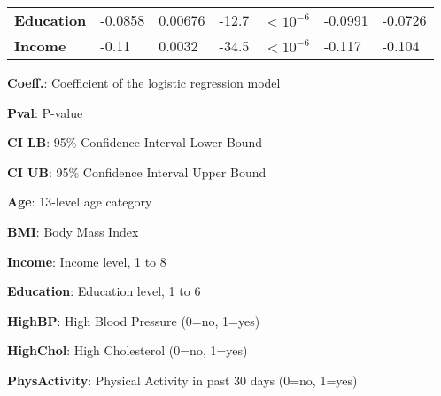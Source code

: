 \documentclass[11pt]{article}
\begin{document}
\begin{table}[h]
\begin{threeparttable}
{\begin{tabular}{lllllll}
\textbf{Education} & \raisebox{2ex}{\hypertarget{B7a}{}}-0.0858 & \raisebox{2ex}{\hypertarget{B7b}{}}0.00676 & \raisebox{2ex}{\hypertarget{B7c}{}}-12.7 & $<$\raisebox{2ex}{\hypertarget{B7d}{}}$10^{-6}$ & \raisebox{2ex}{\hypertarget{B7e}{}}-0.0991 & \raisebox{2ex}{\hypertarget{B7f}{}}-0.0726 \\
\textbf{Income} & \raisebox{2ex}{\hypertarget{B8a}{}}-0.11 & \raisebox{2ex}{\hypertarget{B8b}{}}0.0032 & \raisebox{2ex}{\hypertarget{B8c}{}}-34.5 & $<$\raisebox{2ex}{\hypertarget{B8d}{}}$10^{-6}$ & \raisebox{2ex}{\hypertarget{B8e}{}}-0.117 & \raisebox{2ex}{\hypertarget{B8f}{}}-0.104 \\
\bottomrule
\end{tabular}}
\begin{tablenotes}
\footnotesize
\item \textbf{Coeff.}: Coefficient of the logistic regression model
\item \textbf{Pval}: P-value
\item \textbf{CI LB}: 95\% Confidence Interval Lower Bound
\item \textbf{CI UB}: 95\% Confidence Interval Upper Bound
\item \textbf{Age}: 13-level age category
\item \textbf{BMI}: Body Mass Index
\item \textbf{Income}: Income level, 1 to 8
\item \textbf{Education}: Education level, 1 to 6
\item \textbf{HighBP}: High Blood Pressure (0=no, 1=yes)
\item \textbf{HighChol}: High Cholesterol (0=no, 1=yes)
\item \textbf{PhysActivity}: Physical Activity in past 30 days (0=no, 1=yes)
\end{tablenotes}
\end{threeparttable}
\end{table}
\end{document}

